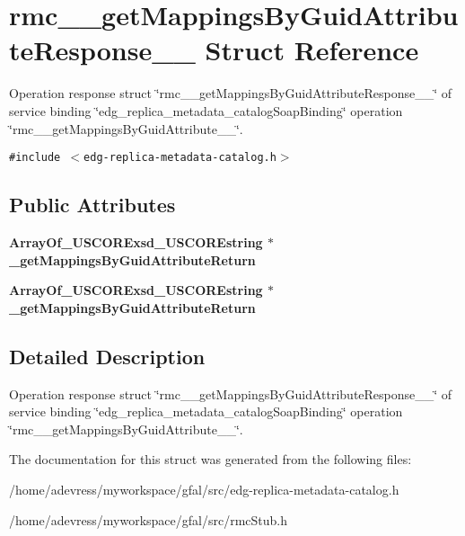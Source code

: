 \section{rmc\_\-\_\-get\-Mappings\-By\-Guid\-Attribute\-Response\_\-\_\- Struct Reference}
\label{structrmc____getMappingsByGuidAttributeResponse____}
Operation response struct \char`\"{}rmc\_\-\_\-get\-Mappings\-By\-Guid\-Attribute\-Response\_\-\_\-\char`\"{} of service binding \char`\"{}edg\_\-replica\_\-metadata\_\-catalog\-Soap\-Binding\char`\"{} operation \char`\"{}rmc\_\-\_\-get\-Mappings\-By\-Guid\-Attribute\_\-\_\-\char`\"{}.  


{\tt \#include $<$edg-replica-metadata-catalog.h$>$}

\subsection*{Public Attributes}
\begin{CompactItemize}
\item 
\bf{Array\-Of\_\-USCORExsd\_\-USCOREstring} $\ast$ \textbf{\_\-get\-Mappings\-By\-Guid\-Attribute\-Return}\label{structrmc____getMappingsByGuidAttributeResponse_____981fbee0bb47ccee6e195e2902eb7c76}

\item 
\bf{Array\-Of\_\-USCORExsd\_\-USCOREstring} $\ast$ \textbf{\_\-get\-Mappings\-By\-Guid\-Attribute\-Return}\label{structrmc____getMappingsByGuidAttributeResponse_____981fbee0bb47ccee6e195e2902eb7c76}

\end{CompactItemize}


\subsection{Detailed Description}
Operation response struct \char`\"{}rmc\_\-\_\-get\-Mappings\-By\-Guid\-Attribute\-Response\_\-\_\-\char`\"{} of service binding \char`\"{}edg\_\-replica\_\-metadata\_\-catalog\-Soap\-Binding\char`\"{} operation \char`\"{}rmc\_\-\_\-get\-Mappings\-By\-Guid\-Attribute\_\-\_\-\char`\"{}. 



The documentation for this struct was generated from the following files:\begin{CompactItemize}
\item 
/home/adevress/myworkspace/gfal/src/edg-replica-metadata-catalog.h\item 
/home/adevress/myworkspace/gfal/src/rmc\-Stub.h\end{CompactItemize}
